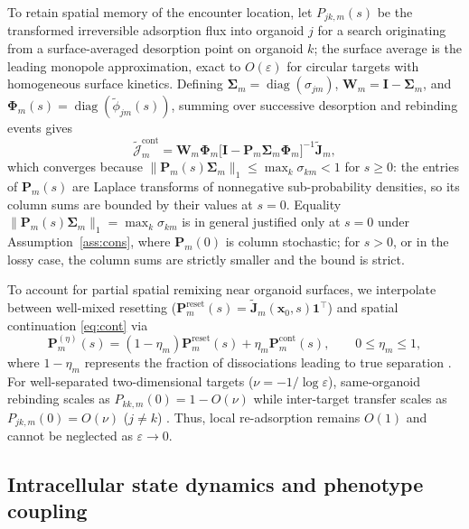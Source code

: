 \documentclass[pdflatex,sn-mathphys-num]{sn-jnl}
\numberwithin{equation}{section}
\theoremstyle{thmstyleone}%
\theoremstyle{definition}
\theoremstyle{remark}
\DeclareMathOperator{\diag}{diag}
\begin{document}
To retain spatial memory of the encounter location, let $P_{jk,m}(s)$ be the transformed irreversible adsorption flux into organoid $j$ for a search originating from a surface-averaged desorption point on organoid $k$; the surface average is the leading monopole approximation, exact to $O(\varepsilon)$ for
circular targets with homogeneous surface kinetics. Defining $\bm\Sigma_m=\diag(\sigma_{jm})$, $\bm W_m=\mathbf I-\bm\Sigma_m$, and $\bm\Phi_m(s)=\diag(\widetilde\phi_{jm}(s))$, summing over successive desorption and rebinding events gives \cite{bressloff2025asymptotic,cai2026optimal}
\begin{equation}
\widetilde{\bm{\mathcal J}}^{\mathrm{cont}}_m
=\bm W_m\bm\Phi_m\bigl[\mathbf I-\mathbf P_m\bm\Sigma_m\bm\Phi_m\bigr]^{-1}
\widetilde{\mathbf J}_m ,
\label{eq:cont}
\end{equation}
which converges because $\|\mathbf P_m(s)\bm\Sigma_m\|_1\le\max_k\sigma_{km}<1$ for $s\ge0$: the entries of $\mathbf P_m(s)$ are Laplace transforms of nonnegative sub-probability densities, so its column sums are bounded by their values at $s=0$. Equality $\|\mathbf P_m(s)\bm\Sigma_m\|_1 =\max_k\sigma_{km}$ is in general justified only at $s=0$ under Assumption~\ref{ass:cons}, where $\mathbf P_m(0)$ is column stochastic; for $s>0$, or in the lossy case, the column sums are strictly smaller and the bound is strict.  

To account for partial spatial remixing near organoid surfaces, we interpolate between well-mixed resetting ($\mathbf P^{\mathrm{reset}}_m(s)=\widetilde{\mathbf J}_m(\mathbf x_0,s)\mathbf1^\top$) and spatial continuation \eqref{eq:cont} via
\begin{equation*}
\mathbf P^{(\eta)}_m(s)=(1-\eta_m)\mathbf P^{\mathrm{reset}}_m(s)
+\eta_m\mathbf P^{\mathrm{cont}}_m(s),\qquad 0\le\eta_m\le1 ,
\end{equation*}
where $1-\eta_m$ represents the fraction of dissociations leading to true separation \cite{goldstein1995approximating,goldstein1999influence,wang2026elliptic}. For well-separated two-dimensional targets ($\nu=-1/\log\varepsilon$), same-organoid rebinding scales as $P_{kk,m}(0)=1-O(\nu)$ while inter-target transfer scales as $P_{jk,m}(0)=O(\nu)$ ($j\neq k$) \cite{bressloff2025asymptotic,liu2025bidirectional}. Thus, local re-adsorption remains $O(1)$ and cannot be neglected as $\varepsilon\to0$.

\subsection{Intracellular state dynamics and phenotype coupling}
\label{subsec:state}
\end{document}
